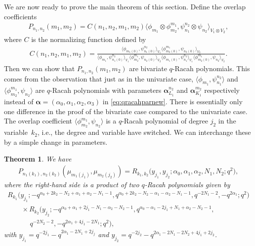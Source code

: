 \documentclass[10pt,a4paper]{amsart}
\numberwithin{equation}{section}
\newtheorem{Theorem}{Theorem}[section]
\begin{document}
We are now ready to prove the main theorem of this section. Define the overlap coefficients
\begin{gather}
	P_{n_1,n_2}(m_1,m_2)=C(n_1,n_2,m_1,m_2)\big\langle \phi_{m_1}\otimes \phi_{m_2}^{m_1},\psi_{n_1}^{n_2}\otimes \psi_{n_2}\big\rangle_{V_1\otimes V_2},\label{eq:defbivarqracah}
\end{gather}
where $C$ is the normalizing function defined by
\begin{align}
	C(n_1,n_2,m_1,m_2)=\frac{\big\langle\phi_{m_1(0)},\psi_{n_1(0)}^{n_2}\big\rangle_{V_1} \big\langle\phi_{m_2(0)}^{m_1}, \psi_{n_2(0)}\big\rangle_{V_2}}{\big\langle\phi_{m_1},\psi_{n_1(0)}^{n_2}\big\rangle_{V_1}\big\langle \phi_{m_2}^{m_1},\psi_{n_2(0)}\big\rangle_{V_2}\big\langle\phi_{m_1(0)},\psi_{n_1}^{n_2}\big\rangle_{V_1} \big\langle\phi_{m_2(0)}^{m_1},\psi_{n_2}\big\rangle_{V_2}}.\label{eq:normalizingbivar}
\end{align}
Then we can show that $P_{n_1,n_2}(m_1,m_2)$ are bivariate $q$-Racah polynomials. This comes from the observation that just as in the univariate case, $\big\langle\phi_{m_1},\psi_{n_1}^{n_2}\big\rangle$ and $\big\langle\phi_{m_2}^{m_1},\psi_{n_2}\big\rangle$ are $q$-Racah polynomials with parameters $\bm{\alpha}^{n_2}_{L_1}$ and $\bm{\alpha}_{K_1}^{m_2}$ respectively instead of $\bm{\alpha}=(\alpha_0,\alpha_1,\alpha_2,\alpha_3)$ in \eqref{eq:qracahparnew}. There is essentially only one difference in the proof of the bivariate case compared to the univariate case. The overlap coefficient $\big\langle\phi_{m_2}^{m_1},\psi_{n_2}\big\rangle$ is a $q$-Racah polynomial of degree $j_2$ in the variable~$k_2$, i.e., the degree and variable have switched. We can interchange these by a simple change in parameters.

\begin{Theorem}
	We have
	\begin{gather*}
		P_{n_1(k_1),n_2(k_2)}(\mu_{m_1(j_1)},\mu_{m_2(j_2)})=R_{k_1,k_2}\big(y_{j_1},y_{j_2};\alpha_0,\alpha_1,\alpha_2,N_1,N_2;q^2\big),
	\end{gather*}
	where the right-hand side is a product of two $q$-Racah polynomials given by
	\begin{gather}
R_{k_1}\big(y_{j_1};-q^{\alpha_0+2k_2-N_2+\alpha_1+\alpha_2-N_1-1}, q^{\alpha_0+2k_2-N_2-\alpha_1-\alpha_2-N_1-1}, q^{-2N_1-2},-q^{2\alpha_1};q^2\big)\nonumber\\
\qquad{} \times R_{k_2}\big(y_{j_2};-q^{\alpha_0+\alpha_1+2j_1-N_1-\alpha_2-N_2-1}, q^{\alpha_0-\alpha_1-2j_1+N_1+\alpha_2-N_2-1},\nonumber\\
\qquad\quad \ {} q^{-2N_2-2},-q^{2\alpha_1+4j_1-2N_1};q^2\big),
 \label{eq:bivarqracahmijn}
	\end{gather}
	with $y_{j_1}=q^{-2j_1}-q^{2\alpha_1-2N_1+2j_j}$ and $y_{j_2} = q^{-2j_2}-q^{2\alpha_1-2N_1-2N_2+4j_1+2j_2}$.
\end{Theorem}
\end{document}
